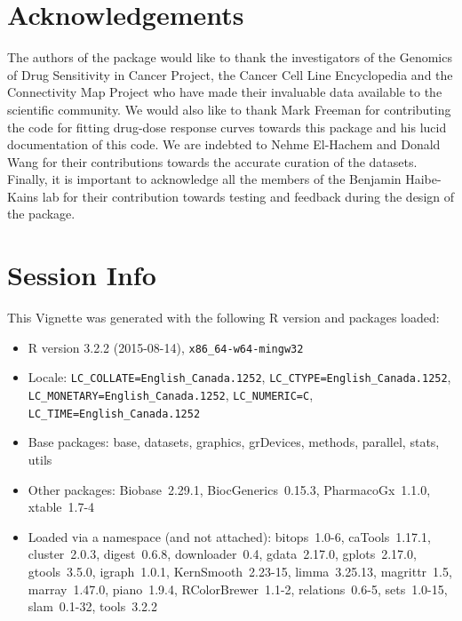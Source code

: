 \documentclass[11pt]{article}
\begin{document}
\section{Acknowledgements}
The authors of the package would like to thank the investigators of the Genomics of Drug Sensitivity in Cancer Project, the Cancer Cell Line Encyclopedia and the Connectivity Map Project who have made their invaluable data available to the scientific community. We would also like to thank Mark Freeman for contributing the code for fitting drug-dose response curves towards this package and his lucid documentation of this code. We are indebted to Nehme El-Hachem and Donald Wang for their contributions towards the accurate curation of the datasets. Finally, it is important to acknowledge all the members of the Benjamin Haibe-Kains lab for their contribution towards testing and feedback during the design of the package.\\

\section*{Session Info}

This Vignette was generated with the following R version and packages loaded:

\begin{itemize}\raggedright
  \item R version 3.2.2 (2015-08-14), \verb|x86_64-w64-mingw32|
  \item Locale: \verb|LC_COLLATE=English_Canada.1252|, \verb|LC_CTYPE=English_Canada.1252|, \verb|LC_MONETARY=English_Canada.1252|, \verb|LC_NUMERIC=C|, \verb|LC_TIME=English_Canada.1252|
  \item Base packages: base, datasets, graphics, grDevices, methods,
    parallel, stats, utils
  \item Other packages: Biobase~2.29.1, BiocGenerics~0.15.3,
    PharmacoGx~1.1.0, xtable~1.7-4
  \item Loaded via a namespace (and not attached): bitops~1.0-6,
    caTools~1.17.1, cluster~2.0.3, digest~0.6.8, downloader~0.4,
    gdata~2.17.0, gplots~2.17.0, gtools~3.5.0, igraph~1.0.1,
    KernSmooth~2.23-15, limma~3.25.13, magrittr~1.5, marray~1.47.0,
    piano~1.9.4, RColorBrewer~1.1-2, relations~0.6-5, sets~1.0-15,
    slam~0.1-32, tools~3.2.2
\end{itemize}


\end{document}
